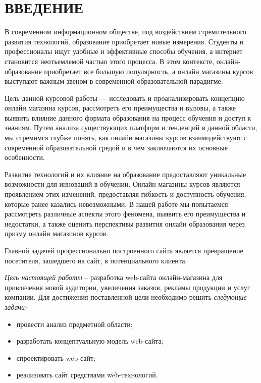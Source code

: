 \section*{ВВЕДЕНИЕ}

В современном информационном обществе, под воздействием стремительного развития технологий, образование приобретает новые измерения. Студенты и профессионалы ищут удобные и эффективные способы обучения, а интернет становится неотъемлемой частью этого процесса. В этом контексте, онлайн-образование приобретает все большую популярность, а онлайн магазины курсов выступают важным звеном в современной образовательной парадигме.

Цель данной курсовой работы — исследовать и проанализировать концепцию онлайн магазина курсов, рассмотреть его преимущества и вызовы, а также выявить влияние данного формата образования на процесс обучения и доступ к знаниям. Путем анализа существующих платформ и тенденций в данной области, мы стремимся глубже понять, как онлайн магазины курсов взаимодействуют с современной образовательной средой и в чем заключаются их основные особенности.

Развитие технологий и их влияние на образование предоставляют уникальные возможности для инноваций в обучении. Онлайн магазины курсов являются проявлением этих изменений, предоставляя гибкость и доступность обучения, которые ранее казались невозможными. В нашей работе мы попытаемся рассмотреть различные аспекты этого феномена, выявить его преимущества и недостатки, а также оценить перспективы развития онлайн образования через призму онлайн магазинов курсов.

Главной задачей профессионально построенного сайта является превращение посетителя, зашедшего на сайт, в потенциального клиента.

\emph{Цель настоящей работы} – разработка web-сайта онлайн-магазина для привлечения новой аудитории, увеличения заказов, рекламы продукции и услуг компании. Для достижения поставленной цели необходимо решить \emph{следующие задачи:}
\begin{itemize}
\item провести анализ предметной области;
\item разработать концептуальную модель web-сайта;
\item спроектировать web-сайт;
\item реализовать сайт средствами web-технологий.
\end{itemize}

